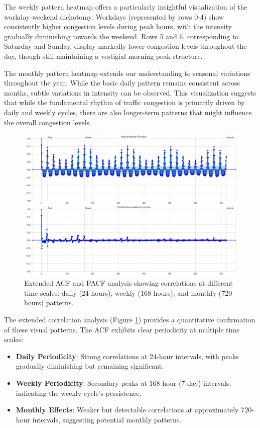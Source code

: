 \documentclass{article}
\begin{document}
The weekly pattern heatmap offers a particularly insightful visualization of the workday-weekend dichotomy. Workdays (represented by rows 0-4) show consistently higher congestion levels during peak hours, with the intensity gradually diminishing towards the weekend. Rows 5 and 6, corresponding to Saturday and Sunday, display markedly lower congestion levels throughout the day, though still maintaining a vestigial morning peak structure.

The monthly pattern heatmap extends our understanding to seasonal variations throughout the year. While the basic daily pattern remains consistent across months, subtle variations in intensity can be observed. This visualization suggests that while the fundamental rhythm of traffic congestion is primarily driven by daily and weekly cycles, there are also longer-term patterns that might influence the overall congestion levels.

\begin{figure}[htbp]
    \centering
    \includegraphics[width=\textwidth]{acf_pacf_extended.png}
    \caption{Extended ACF and PACF analysis showing correlations at different time scales: daily (24 hours), weekly (168 hours), and monthly (720 hours) patterns.}
    \label{fig:acf_extended}
\end{figure}

The extended correlation analysis (Figure \ref{fig:acf_extended}) provides a quantitative confirmation of these visual patterns. The ACF exhibits clear periodicity at multiple time scales:

\begin{itemize}
    \item \textbf{Daily Periodicity}: Strong correlations at 24-hour intervals, with peaks gradually diminishing but remaining significant.
    \item \textbf{Weekly Periodicity}: Secondary peaks at 168-hour (7-day) intervals, indicating the weekly cycle's persistence.
    \item \textbf{Monthly Effects}: Weaker but detectable correlations at approximately 720-hour intervals, suggesting potential monthly patterns.
\end{itemize}
\end{document}
